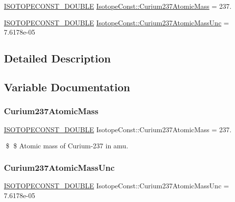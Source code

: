 \begin{DoxyCompactItemize}
\item 
\mbox{\hyperlink{group___isotope_const-_macros_ga8f45a7272ce02c0b4c65c44636ed719a}{I\+S\+O\+T\+O\+P\+E\+C\+O\+N\+S\+T\+\_\+\+D\+O\+U\+B\+LE}} \mbox{\hyperlink{group___isotope_const-_curium-_cm237_gacf68423fdfd26ea3e945f7fc07286b82}{Isotope\+Const\+::\+Curium237\+Atomic\+Mass}} = 237.
\item 
\mbox{\hyperlink{group___isotope_const-_macros_ga8f45a7272ce02c0b4c65c44636ed719a}{I\+S\+O\+T\+O\+P\+E\+C\+O\+N\+S\+T\+\_\+\+D\+O\+U\+B\+LE}} \mbox{\hyperlink{group___isotope_const-_curium-_cm237_ga1c6513b32ff6c618e93e3a261bbfe2df}{Isotope\+Const\+::\+Curium237\+Atomic\+Mass\+Unc}} = 7.\+6178e-\/05
\end{DoxyCompactItemize}


\subsection{Detailed Description}


\subsection{Variable Documentation}
\mbox{\label{group___isotope_const-_curium-_cm237_gacf68423fdfd26ea3e945f7fc07286b82}} 
\subsubsection{\texorpdfstring{Curium237\+Atomic\+Mass}{Curium237AtomicMass}}
{\footnotesize\ttfamily \mbox{\hyperlink{group___isotope_const-_macros_ga8f45a7272ce02c0b4c65c44636ed719a}{I\+S\+O\+T\+O\+P\+E\+C\+O\+N\+S\+T\+\_\+\+D\+O\+U\+B\+LE}} Isotope\+Const\+::\+Curium237\+Atomic\+Mass = 237.}

\$ \$ Atomic mass of Curium-\/237 in amu. \mbox{\label{group___isotope_const-_curium-_cm237_ga1c6513b32ff6c618e93e3a261bbfe2df}} 
\subsubsection{\texorpdfstring{Curium237\+Atomic\+Mass\+Unc}{Curium237AtomicMassUnc}}
{\footnotesize\ttfamily \mbox{\hyperlink{group___isotope_const-_macros_ga8f45a7272ce02c0b4c65c44636ed719a}{I\+S\+O\+T\+O\+P\+E\+C\+O\+N\+S\+T\+\_\+\+D\+O\+U\+B\+LE}} Isotope\+Const\+::\+Curium237\+Atomic\+Mass\+Unc = 7.\+6178e-\/05}

